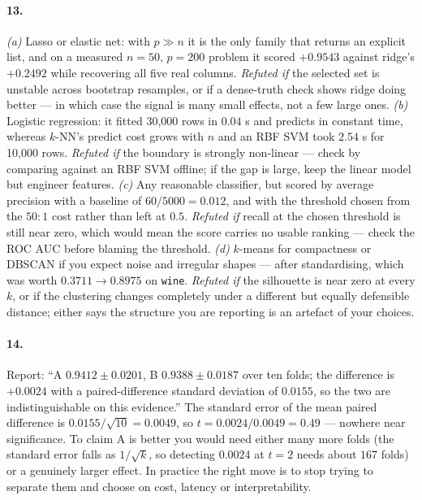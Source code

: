 \documentclass[11pt]{article}
\begin{document}
\paragraph{13.} \emph{(a)} Lasso or elastic net: with $p \gg n$ it is the only
family that returns an explicit list, and on a measured $n=50$, $p=200$
problem it scored $+0.9543$ against ridge's $+0.2492$ while recovering all
five real columns. \emph{Refuted if} the selected set is unstable across
bootstrap resamples, or if a dense-truth check shows ridge doing better ---
in which case the signal is many small effects, not a few large ones.
\emph{(b)} Logistic regression: it fitted 30{,}000 rows in $0.04$ s and
predicts in constant time, whereas $k$-NN's predict cost grows with $n$ and
an RBF SVM took $2.54$ s for 10{,}000 rows. \emph{Refuted if} the boundary is
strongly non-linear --- check by comparing against an RBF SVM offline; if the
gap is large, keep the linear model but engineer features.
\emph{(c)} Any reasonable classifier, but scored by average precision with a
baseline of $60/5000 = 0.012$, and with the threshold chosen from the
$50:1$ cost rather than left at $0.5$. \emph{Refuted if} recall at the chosen
threshold is still near zero, which would mean the score carries no usable
ranking --- check the ROC AUC before blaming the threshold.
\emph{(d)} $k$-means for compactness or DBSCAN if you expect noise and
irregular shapes --- after standardising, which was worth
$0.3711 \to 0.8975$ on \texttt{wine}. \emph{Refuted if} the silhouette is
near zero at every $k$, or if the clustering changes completely under a
different but equally defensible distance; either says the structure you are
reporting is an artefact of your choices.

\paragraph{14.} Report: ``A $0.9412 \pm 0.0201$, B $0.9388 \pm 0.0187$ over
ten folds; the difference is $+0.0024$ with a paired-difference standard
deviation of $0.0155$, so the two are indistinguishable on this evidence.''
The standard error of the mean paired difference is
$0.0155/\sqrt{10} = 0.0049$, so $t = 0.0024/0.0049 = 0.49$ --- nowhere near
significance. To claim A is better you would need either many more folds (the
standard error falls as $1/\sqrt{k}$, so detecting $0.0024$ at $t = 2$ needs
about $167$ folds) or a genuinely larger effect. In practice the right move
is to stop trying to separate them and choose on cost, latency or
interpretability.
\end{document}

